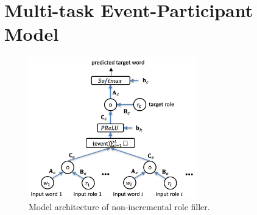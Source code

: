 \documentclass[a4paper]{article}
\begin{document}
 
\section{Multi-task Event-Participant Model} \label{sec:mtep}


\begin{figure}[t]
\centering
\includegraphics[width=0.65\textwidth]{NNRF.png}
\caption{\label{fig:NNRF} Model architecture of non-incremental role filler.}
\end{figure}
\end{document}
